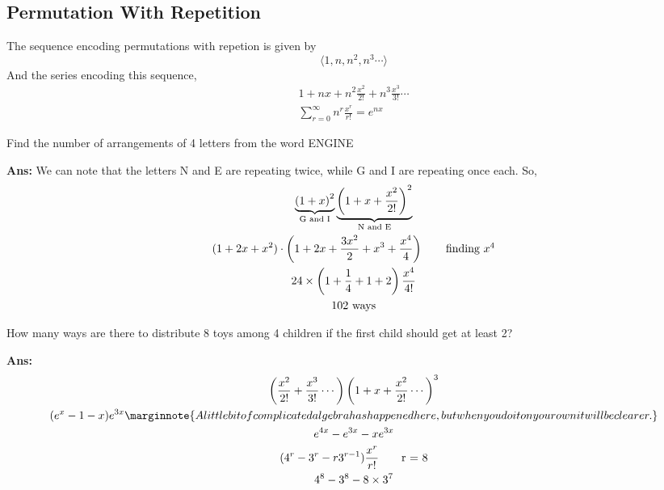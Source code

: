\subsection{Permutation With Repetition}
The sequence encoding permutations with repetion is given by
\begin{equation*}
    \langle 1,n,n^2,n^3 \cdots\rangle
\end{equation*}
And the series encoding this sequence,
\begin{gather*}
    1 + nx + n^2\frac{x^2}{2!} + n^3 \frac{x^3}{3!} \cdots \\
    \sum_{r = 0}^{\infty} n^r \frac{x^r}{r!} = e^{nx}
\end{gather*}

\begin{example}
    Find the number of arrangements of 4 letters from the word ENGINE

    \textbf{Ans:} We can note that the letters N and E are repeating twice, while G and I are repeating once each. So,
    \begin{gather*}
        \underbrace{{(1 + x)}^2}_{\text{G and I}} \underbrace{{\left(1 + x + \frac{x^2}{2!}\right)}^2}_{\text{N and E}}\\
        (1 + 2x + x^2) \cdot \left(1 + 2x + \frac{3x^2}{2} + x^3 + \frac{x^4}{4}\right) \tag*{finding \mbox{\(x^4\)}} \\
        24 \times \left(1 +\frac{1}{4} + 1 + 2\right) \frac{x^4}{4!}\\
        102 \text{ ways}
    \end{gather*}
\end{example}

\begin{example}
    How many ways are there to distribute 8 toys among 4 children if the first child should get at least 2?

    \textbf{Ans:} \begin{gather*}
        \left(\frac{x^2}{2!} + \frac{x^3}{3!}\cdots\right) {\left(1 + x + \frac{x^2}{2!}\cdots\right)}^3\\
        (e^x - 1 - x) e^{3x} \marginnote{A little bit of complicated algebra has happened here, but when you do it on your own it will be clearer.}\\
        e^{4x} - e^{3x} - xe^{3x} \\
        ( 4^r - 3^r - r3^{r - 1} )\frac{x^r}{r!} \tag*{r = 8} \\
        4^8 - 3^8 - 8 \times 3^7
    \end{gather*}
\end{example}

